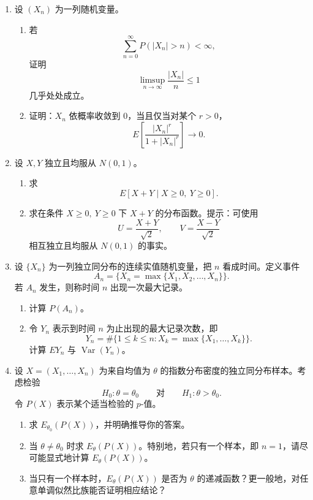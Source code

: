\documentclass[UTF8,12pt]{ctexart}
\begin{document}
\begin{enumerate}[label=\textbf{\arabic*.},leftmargin=2.2em]
\item 设 \((X_n)\) 为一列随机变量。
\begin{enumerate}[label=\textbf{(\arabic*)},leftmargin=2.4em]
\item 若
\[
\sum_{n=0}^{\infty}P(|X_n|>n)<\infty,
\]
证明
\[
\limsup_{n\to\infty}\frac{|X_n|}{n}\le1
\]
几乎处处成立。
\item 证明：\(X_n\) 依概率收敛到 \(0\)，当且仅当对某个 \(r>0\)，
\[
E\left[\frac{|X_n|^r}{1+|X_n|^r}\right]\to0.
\]
\end{enumerate}

\item 设 \(X,Y\) 独立且均服从 \(N(0,1)\)。
\begin{enumerate}[label=\textbf{(\arabic*)},leftmargin=2.4em]
\item 求
\[
E[X+Y\mid X\ge0,\ Y\ge0].
\]
\item 求在条件 \(X\ge0,\ Y\ge0\) 下 \(X+Y\) 的分布函数。提示：可使用
\[
U=\frac{X+Y}{\sqrt2},\qquad V=\frac{X-Y}{\sqrt2}
\]
相互独立且均服从 \(N(0,1)\) 的事实。
\end{enumerate}

\item 设 \(\{X_n\}\) 为一列独立同分布的连续实值随机变量，把 \(n\) 看成时间。定义事件
\[
A_n=\{X_n=\max\{X_1,X_2,\ldots,X_n\}\}.
\]
若 \(A_n\) 发生，则称时间 \(n\) 出现一次最大记录。
\begin{enumerate}[label=\textbf{(\arabic*)},leftmargin=2.4em]
\item 计算 \(P(A_n)\)。
\item 令 \(Y_n\) 表示到时间 \(n\) 为止出现的最大记录次数，即
\[
Y_n=\#\{1\le k\le n:X_k=\max\{X_1,\ldots,X_k\}\}.
\]
计算 \(E Y_n\) 与 \(\operatorname{Var}(Y_n)\)。
\end{enumerate}

\item 设 \(X=(X_1,\ldots,X_n)\) 为来自均值为 \(\theta\) 的指数分布密度的独立同分布样本。考虑检验
\[
H_0:\theta=\theta_0\qquad \text{对}\qquad H_1:\theta>\theta_0.
\]
令 \(P(X)\) 表示某个适当检验的 \(p\)-值。
\begin{enumerate}[label=\textbf{(\alph*)},leftmargin=2.4em]
\item 求 \(E_{\theta_0}(P(X))\)，并明确推导你的答案。
\item 当 \(\theta\ne\theta_0\) 时求 \(E_\theta(P(X))\)。特别地，若只有一个样本，即 \(n=1\)，请尽可能显式地计算 \(E_\theta(P(X))\)。
\item 当只有一个样本时，\(E_\theta(P(X))\) 是否为 \(\theta\) 的递减函数？更一般地，对任意单调似然比族能否证明相应结论？
\end{enumerate}


\end{enumerate}
\end{document}

